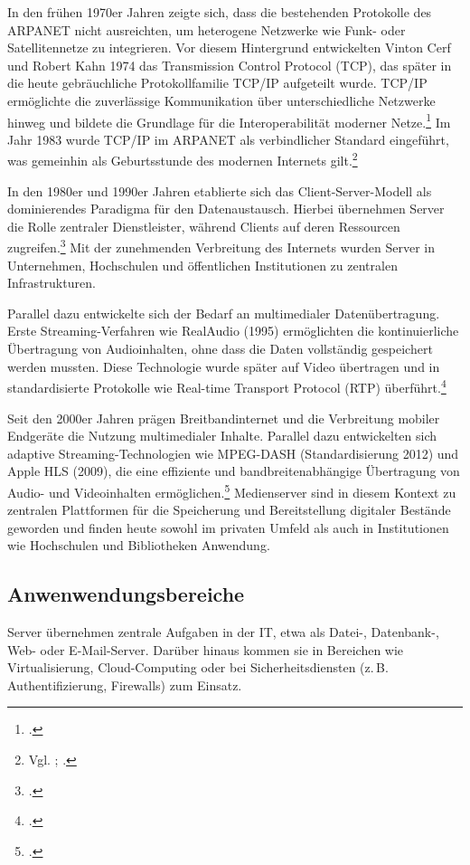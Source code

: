 \documentclass[12pt,a4paper]{report}
\begin{document}
  In den frühen 1970er Jahren zeigte sich, dass die bestehenden Protokolle des ARPANET nicht ausreichten, 
  um heterogene Netzwerke wie Funk- oder Satellitennetze zu integrieren. 
  Vor diesem Hintergrund entwickelten Vinton Cerf und Robert Kahn 1974 das Transmission Control Protocol (TCP), 
  das später in die heute gebräuchliche Protokollfamilie TCP/IP aufgeteilt wurde. 
  TCP/IP ermöglichte die zuverlässige Kommunikation über unterschiedliche Netzwerke hinweg 
  und bildete die Grundlage für die Interoperabilität moderner Netze.\footcite[Vgl.][S.~45]{tanenbaum_computernetworks}
  Im Jahr 1983 wurde TCP/IP im ARPANET als verbindlicher Standard eingeführt,
  was gemeinhin als Geburtsstunde des modernen Internets gilt.\footnote{Vgl. \cite[S.~2]{postel_rfc801}; \cite{britannica_tcpip}.}

  In den 1980er und 1990er Jahren etablierte sich das Client-Server-Modell als dominierendes Paradigma für den Datenaustausch. 
  Hierbei übernehmen Server die Rolle zentraler Dienstleister, 
  während Clients auf deren Ressourcen zugreifen.\footcite[Vgl.][S.~114]{kurose_networking} 
  Mit der zunehmenden Verbreitung des Internets wurden Server in Unternehmen, 
  Hochschulen und öffentlichen Institutionen zu zentralen Infrastrukturen.

  Parallel dazu entwickelte sich der Bedarf an multimedialer Datenübertragung. 
  Erste Streaming-Verfahren wie RealAudio (1995) ermöglichten die kontinuierliche Übertragung von Audioinhalten, 
  ohne dass die Daten vollständig gespeichert werden mussten. 
  Diese Technologie wurde später auf Video übertragen 
  und in standardisierte Protokolle wie Real-time Transport Protocol (RTP) überführt.\footcite[Vgl.][S.~11~ff., S.~273~ff.]{steinmetz_multimedia}

  Seit den 2000er Jahren prägen Breitbandinternet und die Verbreitung mobiler Endgeräte die Nutzung multimedialer Inhalte. 
  Parallel dazu entwickelten sich adaptive Streaming-Technologien wie MPEG-DASH (Standardisierung 2012)
  und Apple HLS (2009), die eine effiziente und bandbreitenabhängige Übertragung von Audio- 
  und Videoinhalten ermöglichen.\footcite[Vgl.]{iso_mpegdash, apple_hls}
  Medienserver sind in diesem Kontext zu zentralen Plattformen für die Speicherung und Bereitstellung digitaler Bestände geworden 
  und finden heute sowohl im privaten Umfeld als auch in Institutionen wie Hochschulen und Bibliotheken Anwendung.

  \subsection{Anwenwendungsbereiche}
  Server übernehmen zentrale Aufgaben in der IT, etwa als Datei-, Datenbank-, Web- oder E-Mail-Server. 
  Darüber hinaus kommen sie in Bereichen wie Virtualisierung, Cloud-Computing
  oder bei Sicherheitsdiensten (z.\,B. Authentifizierung, Firewalls) zum Einsatz.
\end{document}
